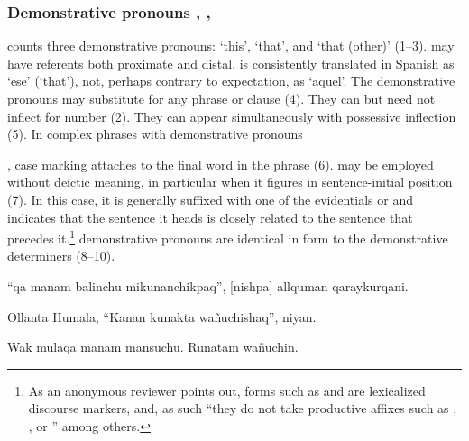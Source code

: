 \subsubsection{Demonstrative pronouns , , }
\SYQ{} counts three demonstrative pronouns:  `this',  `that', and  `that (other)' (1--3).
 may have referents both proximate and distal.  is consistently translated in Spanish as `ese' (`that'), not, perhaps contrary to expectation, as `aquel'. The demonstrative pronouns may substitute for any phrase or clause (4). They can but need not inflect for number (2). They can appear simultaneously with possessive inflection (5). In complex phrases with demonstrative pronouns{, case marking attaches to the final word in the phrase (6).  may be employed without deictic meaning, in particular when it figures in sentence-initial position (7). In this case, it is generally suffixed with one of the evidentials  or  and indicates that the sentence it heads is closely related to the sentence that precedes it.\footnote{As an anonymous reviewer points out, forms such as  and  are lexicalized discourse markers, and, as such ``they do not take productive affixes such as , , or '' among others.} \SYQ{} demonstrative pronouns are identical in form to the demonstrative determiners (8--10).

%
{``qa manam balinchu mikunanchikpaq'', [nishpa] allquman qaraykurqani.}%
{}%
%
{}{}%

%
{Ollanta Humala, ``Kanan kunakta wa\~nuchishaq'', niyan.}%
{}%
{}{}%

%
{Wak mulaqa manam mansuchu. Runatam  wa\~nuchin.}%
{}%
{}{}%

}
